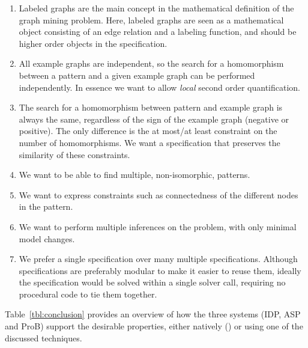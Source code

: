 \begin{enumerate}[itemsep=0mm]
\item Labeled graphs are the main concept in the mathematical definition of the graph mining problem. 
Here, labeled graphs are seen as a mathematical object consisting of an edge relation and a labeling function, and should be higher order objects in the specification.
\item All example graphs are independent, so the search for a homomorphism between a pattern and a given example graph can be performed independently. 
In essence we want to allow \emph{local} second order quantification.  %
\item The search for a homomorphism between pattern and example graph is always the same, regardless of the sign of the example graph (negative or positive). The only difference is the at most/at least constraint on the number of homomorphisms.
We want a specification that preserves the similarity of these constraints.
\item We want to be able to find multiple, non-isomorphic, patterns.
\item We want to express constraints such as connectedness of the different nodes in the pattern.
\item We want to perform multiple inferences on the problem, with only minimal model changes.
\item We prefer a single specification over many multiple specifications. 
Although specifications are preferably modular to make it easier to reuse them, ideally the specification would be solved within a single solver call, requiring no procedural code to tie them together.
\end{enumerate}
Table~\ref{tbl:conclusion} provides an overview of how the three systems (IDP, ASP and ProB) support the desirable properties, either natively (\checkmark) or using one of the discussed techniques.
